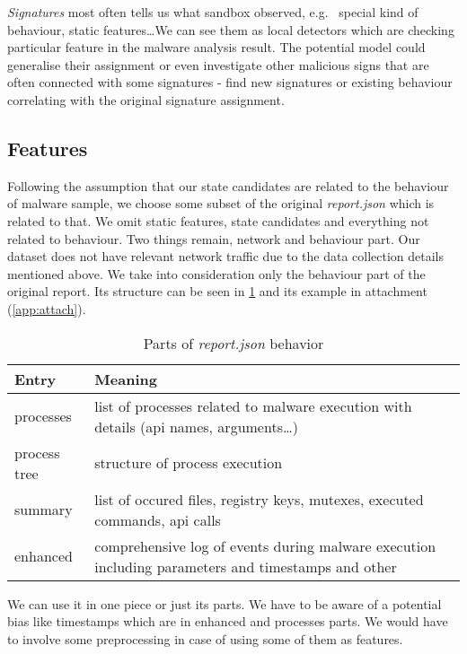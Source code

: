 \emph{Signatures} most often tells us what sandbox observed, e.g. \ special kind of behaviour, static features\dots We can see them as local detectors which are checking particular feature in the malware analysis result. The potential model could generalise their assignment or even investigate other malicious signs that are often connected with some signatures - find new signatures or existing behaviour correlating with the original signature assignment.

\subsection{Features}
Following the assumption that our state candidates are related to the behaviour of malware sample, we choose some subset of the original \emph{report.json} which is related to that. We omit static features, state candidates and everything not related to behaviour. Two things remain, network and behaviour part. Our dataset does not have relevant network traffic due to the data collection details mentioned above. We take into consideration only the behaviour part of the original report. Its structure can be seen in \ref{tab:behavioral} and its example in attachment (\ref{app:attach}).

\begin{table}[h]
    \centering
    \caption{Parts of \emph{report.json} behavior}
    \begin{tabular}{p{2cm}p{12cm}} 
        \toprule
        \textbf{Entry} &
        \textbf{Meaning} \\
        \midrule
        processes & list of processes related to malware execution with details (api names, arguments\dots) \\
        \midrule
        process tree & structure of process execution\\
        \midrule
        summary & list of occured files, registry keys, mutexes, executed commands, api calls \\
        \midrule
        enhanced & comprehensive log of events during malware execution including parameters and timestamps and other\\
        \bottomrule
    \end{tabular}
    \label{tab:behavioral}
\end{table}

We can use it in one piece or just its parts. We have to be aware of a potential bias like timestamps which are in enhanced and processes parts. We would have to involve some preprocessing in case of using some of them as features.

